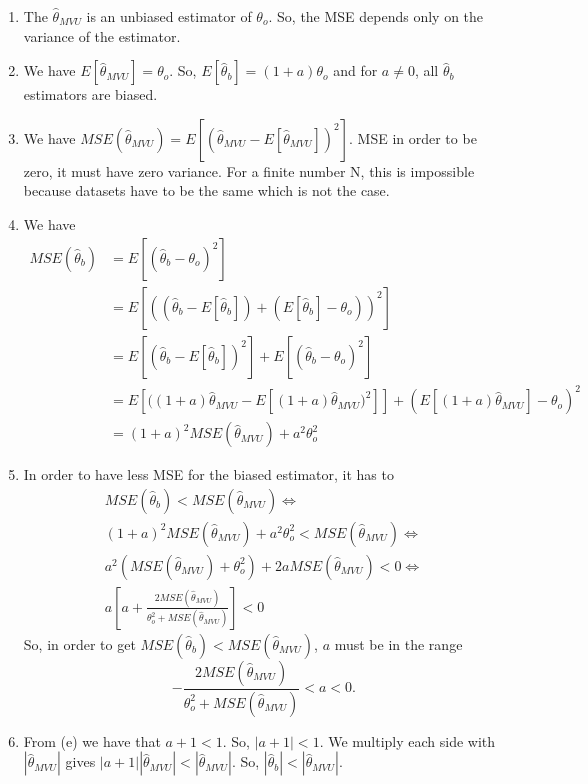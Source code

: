 \documentclass[12pt]{book}
\begin{document}
\begin{enumerate}[label=(\alph*)]
	\item The $\hat{\theta}_{MVU}$ is an unbiased estimator of $\theta_o$. So, the MSE depends only on the variance of the estimator.
	\item We have $E[\hat{\theta}_{MVU}] = \theta_o$. So, $E[\hat{\theta}_{b}] = (1+a)\theta_o$ and for $a \neq 0$, all $\hat{\theta}_{b}$ estimators are biased.
	\item We have $MSE(\hat{\theta}_{MVU}) = E[(\hat{\theta}_{MVU} - E[\hat{\theta}_{MVU}])^2]$. MSE in order to be zero, it must have zero variance. For a finite number N, this is impossible because datasets have to be the same which is not the case.
	\item We have
	\begin{align*}
	MSE(\hat{\theta}_{b}) &= E[(\hat{\theta}_{b} - \theta_o)^2] \\
	&= E[((\hat{\theta}_{b}-E[\hat{\theta}_{b}]) + (E[\hat{\theta}_{b}] - \theta_o))^2] \\
	&= E[(\hat{\theta}_{b}-E[\hat{\theta}_{b}])^2] + E[(\hat{\theta}_{b} - \theta_o)^2] \\
	&= E[((1+a)\hat{\theta}_{MVU}-E[(1+a)\hat{\theta}_{MVU})^2]] + (E[(1+a)\hat{\theta}_{MVU}] - \theta_o)^2 \\
	&= (1+a)^2MSE(\hat{\theta}_{MVU}) + a^2\theta_o^2
	\end{align*}
	\item In order to have less MSE for the biased estimator, it has to
	\begin{align*}
	MSE(\hat{\theta}_{b}) < MSE(\hat{\theta}_{MVU}) \iff \\
	(1+a)^2MSE(\hat{\theta}_{MVU}) + a^2\theta_o^2 < MSE(\hat{\theta}_{MVU}) \iff \\
	a^2(MSE(\hat{\theta}_{MVU}) + \theta_o^2) + 2aMSE(\hat{\theta}_{MVU})<0 \iff \\
	a\left[a + \frac{2MSE(\hat{\theta}_{MVU})}{\theta_o^2 + MSE(\hat{\theta}_{MVU})}\right] < 0
	\end{align*}
	So, in order to get $MSE(\hat{\theta}_{b}) < MSE(\hat{\theta}_{MVU})$, $a$ must be in the range
	\begin{equation*}
	-\frac{2MSE(\hat{\theta}_{MVU})}{\theta_o^2 + MSE(\hat{\theta}_{MVU})} < a <0.
	\end{equation*}
	\item From (e) we have that $a+1<1$. So, $|a+1|<1$. We multiply each side with $|\hat{\theta}_{MVU}|$ gives $|a+1||\hat{\theta}_{MVU}|<|\hat{\theta}_{MVU}|$. So, $|\hat{\theta}_{b}|<|\hat{\theta}_{MVU}|$.

\end{enumerate}
\end{document}
